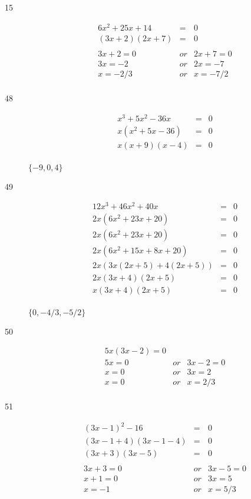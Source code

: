 \documentclass[fleqn,addpoints]{exam}
\begin{document}
\begin{description}
\item[15]
\begin{eqnarray*}
  6x^2 + 25x + 14 &=& 0 \\
  (3x + 2)(2x + 7) &=& 0 \\
  \\
  3x + 2 = 0 &or& 2x + 7 = 0 \\
  3x  = -2 &or& 2x = -7 \\
  x  = -2/3 &or& x = -7/2 \\
\end{eqnarray*}

\item[48]
\begin{eqnarray*}
  x^3 + 5x^2 - 36x &=& 0 \\
  x(x^2 + 5x - 36) &=& 0 \\
  x(x + 9)(x - 4) &=& 0 \\
\end{eqnarray*}

$\{-9, 0, 4\}$

\item[49]
\begin{eqnarray*}
  12x^3 + 46x^2 + 40x &=& 0 \\
  2x(6x^2 + 23x + 20) &=& 0 \\
  2x(6x^2 + 23x + 20) &=& 0 \\
  2x(6x^2 + 15x + 8x + 20) &=& 0 \\
  2x( 3x(2x + 5) + 4(2x + 5)) &=& 0 \\
  2x(3x + 4)(2x + 5) &=& 0 \\
  x(3x + 4)(2x + 5) &=& 0 \\
\end{eqnarray*}

$\{0, -4/3, -5/2\}$

\item[50]
\begin{eqnarray*}
  5x(3x - 2) = 0 \\
  5x = 0 &or& 3x - 2 = 0 \\
  x = 0 &or& 3x  = 2 \\
  x = 0 &or& x  = 2/3 \\
\end{eqnarray*}

\item[51]
\begin{eqnarray*}
  (3x - 1)^2 - 16 &=& 0 \\
  (3x - 1 + 4)(3x - 1 - 4) &=& 0 \\
  (3x + 3)(3x - 5) &=& 0 \\
  \\
  3x + 3 = 0 &or& 3x - 5 = 0 \\
  x + 1 = 0 &or& 3x  = 5 \\
  x = -1 &or& x  = 5/3 \\
\end{eqnarray*}


\end{description}
\end{document}
